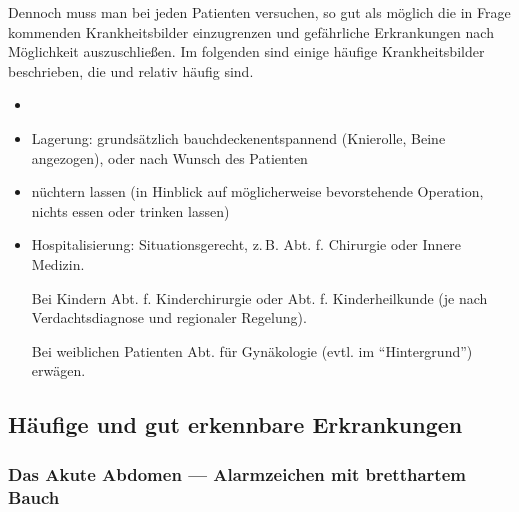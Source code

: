 Dennoch muss man bei jeden Patienten versuchen, so gut als
möglich die in Frage kommenden Krankheitsbilder einzugrenzen
und gefährliche Erkrankungen nach Möglichkeit auszuschließen. Im
folgenden sind einige häufige Krankheitsbilder beschrieben,
die   und relativ häufig sind.

{\label{m:am-abdominalerkrankungen}}{
\begin{itemize}
  \item {} \TxBeiVit
  \TxMassVit
  \item Lagerung: grundsätzlich bauchdeckenentspannend
  (Knierolle, Beine angezogen), oder nach Wunsch des Patienten
  \item nüchtern lassen (in Hinblick auf möglicherweise bevorstehende
  Operation, nichts essen oder trinken lassen)
  \item Hospitalisierung: Situationsgerecht, z.\,B. Abt. f. Chirurgie oder
  Innere Medizin.
  
  Bei Kindern Abt. f. Kinderchirurgie oder Abt. f. Kinderheilkunde (je nach
  Verdachtsdiagnose und regionaler Regelung).
  
  Bei weiblichen Patienten Abt. für Gynäkologie (evtl. im "`Hintergrund"') erwägen.
\end{itemize}
}


\subsection{Häufige und gut erkennbare Erkrankungen}



\subsubsection{Das Akute Abdomen --- Alarmzeichen mit
bretthartem Bauch}\label{topic:akutes-abdomen}






